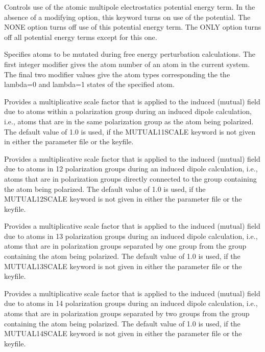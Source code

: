 \documentclass[letterpaper,11pt,english]{sphinxmanual}
\begin{document}
  Controls use of the atomic multipole electrostatics potential energy term. In the absence of a modifying option, this keyword turns on use of the potential. The NONE option turns off use of this potential energy term. The ONLY option turns off all potential energy terms except for this one.

  Specifies atoms to be mutated during free energy perturbation calculations. The first integer modifier gives the atom number of an atom in the current system. The final two modifier values give the atom types corresponding the the lambda=0 and lambda=1 states of the specified atom.

  Provides a multiplicative scale factor that is applied to the induced (mutual) field due to atoms within a polarization group during an induced dipole calculation, i.e., atoms that are in the same polarization group as the atom being polarized. The default value of 1.0 is used, if the MUTUAL\sphinxhyphen{}11\sphinxhyphen{}SCALE keyword is not given in either the parameter file or the keyfile.

  Provides a multiplicative scale factor that is applied to the induced (mutual) field due to atoms in 1\sphinxhyphen{}2 polarization groups during an induced dipole calculation, i.e., atoms that are in polarization groups directly connected to the group containing the atom being polarized. The default value of 1.0 is used, if the MUTUAL\sphinxhyphen{}12\sphinxhyphen{}SCALE keyword is not given in either the parameter file or the keyfile.

  Provides a multiplicative scale factor that is applied to the induced (mutual) field due to atoms in 1\sphinxhyphen{}3 polarization groups during an induced dipole calculation, i.e., atoms that are in polarization groups separated by one group from the group containing the atom being polarized. The default value of 1.0 is used, if the MUTUAL\sphinxhyphen{}13\sphinxhyphen{}SCALE keyword is not given in either the parameter file or the keyfile.

  Provides a multiplicative scale factor that is applied to the induced (mutual) field due to atoms in 1\sphinxhyphen{}4 polarization groups during an induced dipole calculation, i.e., atoms that are in polarization groups separated by two groups from the group containing the atom being polarized. The default value of 1.0 is used, if the MUTUAL\sphinxhyphen{}14\sphinxhyphen{}SCALE keyword is not given in either the parameter file or the keyfile.
\end{document}
